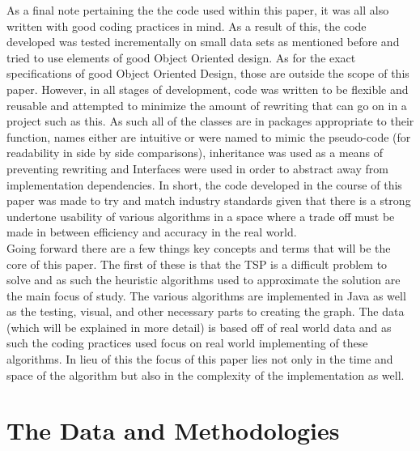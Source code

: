 \documentclass[midd]{thesis}
\newcommand{\tab}{\hspace*{2em}}
\begin{document}
\tab As a final note pertaining the the code used within this paper, it was all also written with good coding practices in mind. As a result of this, the code developed was tested incrementally on small data sets as mentioned before and tried to use elements of good Object Oriented design. As for the exact specifications of good Object Oriented Design, those are outside the scope of this paper. However, in all stages of development, code was written to be flexible and reusable and attempted to minimize the amount of rewriting that can go on in a project such as this. As such all of the classes are in packages appropriate to their function, names either are intuitive or were named to mimic the pseudo-code (for readability in side by side comparisons), inheritance was used as a means of preventing rewriting and Interfaces were used in order to abstract away from implementation dependencies. In short, the code developed in the course of this paper was made to try and match industry standards given that there is a strong undertone usability of various algorithms in a space where a trade off must be made in between efficiency and accuracy in the real world.\\
\tab Going forward there are a few things key concepts and terms that will be the core of this paper. The first of these is that the TSP is a difficult problem to solve and as such the heuristic algorithms used to approximate the solution are the main focus of study. The various algorithms are implemented in Java as well as the testing, visual, and other necessary parts to creating the graph. The data (which will be explained in more detail) is based off of real world data and as such the coding practices used focus on real world implementing of these algorithms. In lieu of this the focus of this paper lies not only in the time and space of the algorithm but also in the complexity of the implementation as well.

\chapter{The Data and Methodologies}
\end{document}
